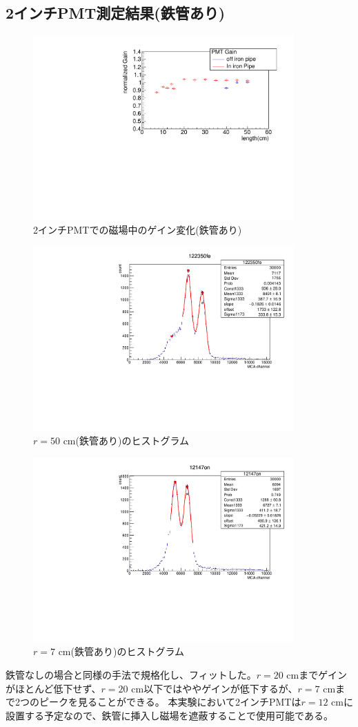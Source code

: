 \subsection{2インチPMT測定結果(鉄管あり)}
\begin{figure}[H]
	\centering
		\includegraphics[angle=-90,width=10cm]{fig/iguchi/bigPMTfit.pdf}
	\caption{2インチPMTでの磁場中のゲイン変化(鉄管あり)}
	\label{bigPMTfit}
\end{figure}
\begin{figure}[H]
	\centering
		\includegraphics[angle=-90,width=10cm]{fig/iguchi/122350fe.pdf}
	\caption{$r=50$ cm(鉄管あり)のヒストグラム}
	\label{hist50fe}
\end{figure}
\begin{figure}[H]
	\centering
		\includegraphics[angle=-90,width=10cm]{fig/iguchi/12147on.pdf}
	\caption{$r=7$ cm(鉄管あり)のヒストグラム}
	\label{hist7fe}
\end{figure}
鉄管なしの場合と同様の手法で規格化し、フィットした。$r=20$ cmまでゲインがほとんど低下せず、$r=20$ cm以下ではややゲインが低下するが、$r=7$ cmまで2つのピークを見ることができる。
本実験において2インチPMTは$r=12$ cmに設置する予定なので、鉄管に挿入し磁場を遮蔽することで使用可能である。

